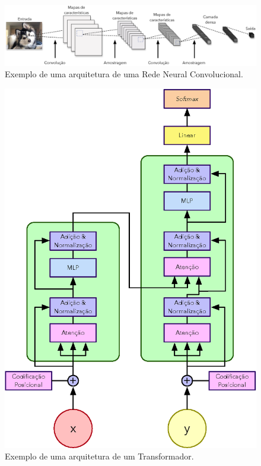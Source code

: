\begin{frame}
	\begin{figure}
		\centering
		\includegraphics[scale=0.275]{figs/cnn.eps}	
		\caption{Exemplo de uma arquitetura de uma Rede Neural Convolucional.}
		\label{f.cnn}
	\end{figure}
\end{frame}

\begin{frame}
	\vspace*{0.5cm}
	\begin{figure}
		\centering
		\includegraphics[scale=0.425]{figs/transformer.eps}	
		\caption{Exemplo de uma arquitetura de um Transformador.}
		\label{f.transformer}
	\end{figure}
\end{frame}